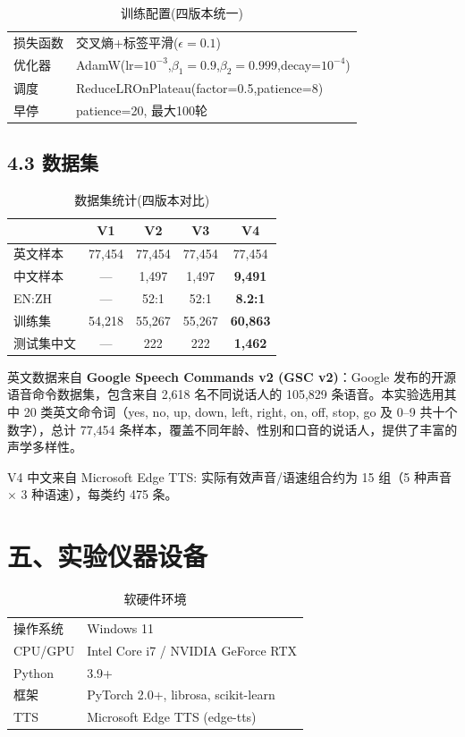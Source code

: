 ﻿\documentclass[12pt,a4paper]{article}
\begin{document}
\begin{table}[H]\centering\caption{训练配置(四版本统一)}
\begin{tabular}{l|l}\toprule
损失函数&交叉熵+标签平滑($\epsilon=0.1$)\\
优化器&AdamW(lr=$10^{-3}$,$\beta_1=0.9$,$\beta_2=0.999$,decay=$10^{-4}$)\\
调度&ReduceLROnPlateau(factor=0.5,patience=8)\\
早停&patience=20, 最大100轮\\\bottomrule
\end{tabular}
\end{table}

\subsection*{4.3 数据集}

\begin{table}[H]\centering\caption{数据集统计(四版本对比)}
\begin{tabular}{l|c|c|c|c}\toprule
&\textbf{V1}&\textbf{V2}&\textbf{V3}&\textbf{V4}\\\midrule
英文样本&77,454&77,454&77,454&77,454\\
中文样本&—&1,497&1,497&\textbf{9,491}\\
EN:ZH&—&52:1&52:1&\textbf{8.2:1}\\
训练集&54,218&55,267&55,267&\textbf{60,863}\\
测试集中文&—&222&222&\textbf{1,462}\\\bottomrule
\end{tabular}
\end{table}

英文数据来自 \textbf{Google Speech Commands v2 (GSC v2)}：Google 发布的开源语音命令数据集，包含来自 2,618 名不同说话人的 105,829 条语音。本实验选用其中 20 类英文命令词（yes, no, up, down, left, right, on, off, stop, go 及 0--9 共十个数字），总计 77,454 条样本，覆盖不同年龄、性别和口音的说话人，提供了丰富的声学多样性。

V4 中文来自 Microsoft Edge TTS: 实际有效声音/语速组合约为 15 组（5 种声音 $\times$ 3 种语速），每类约 475 条。

\section*{五、实验仪器设备}

\begin{table}[H]\centering\caption{软硬件环境}
\begin{tabular}{l|l}\toprule
操作系统&Windows 11\\
CPU/GPU&Intel Core i7 / NVIDIA GeForce RTX\\
Python&3.9+\\
框架&PyTorch 2.0+, librosa, scikit-learn\\
TTS&Microsoft Edge TTS (edge-tts)\\\bottomrule
\end{tabular}
\end{table}
\end{document}
